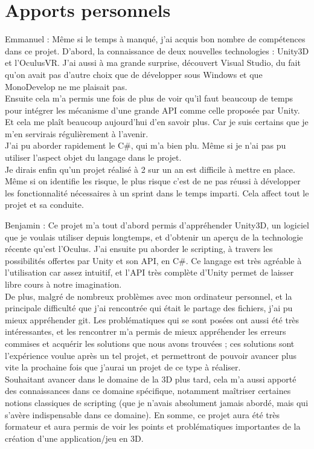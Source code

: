 \documentclass[a4paper,11pt]{myreport}
\begin{document}
\chapter{Apports personnels}
\par Emmanuel : Même si le temps à manqué, j'ai acquis bon nombre de compétences dans ce projet. D'abord, la connaissance de deux nouvelles technologies : Unity3D et l'OculusVR. J'ai aussi à ma grande surprise, découvert Visual Studio, du fait qu'on avait pas d'autre choix que de développer sous Windows et que MonoDevelop ne me plaisait pas.\\
Ensuite cela m'a permis une fois de plus de voir qu'il faut beaucoup de temps pour intégrer les mécanisme d'une grande API comme celle proposée par Unity. Et cela me plaît beaucoup aujourd'hui d'en savoir plus. Car je suis certains que je m'en servirais régulièrement à l'avenir.\\
J'ai pu aborder rapidement le C\#, qui m'a bien plu. Même si je n'ai pas pu utiliser l'aspect objet du langage dans le projet.\\
Je dirais enfin qu'un projet réalisé à 2 sur un an est difficile à mettre en place. Même si on identifie les risque, le plus risque c'est de ne pas réussi à développer les fonctionnalité nécessaires à un sprint dans le temps imparti. Cela affect tout le projet et sa conduite.
\par Benjamin : Ce projet m'a tout d'abord permis d'appréhender Unity3D, un logiciel que je voulais utiliser depuis longtemps, et d'obtenir un aperçu de la technologie récente qu'est l'Oculus. J'ai ensuite pu aborder le scripting, à travers les possibilités offertes par Unity et son API, en C\#. Ce langage est très agréable à l'utilisation car assez intuitif, et l'API très complète d'Unity permet de laisser libre cours à notre imagination.\\
De plus, malgré de nombreux problèmes avec mon ordinateur personnel, et la principale difficulté que j'ai rencontrée qui était le partage des fichiers, j'ai pu mieux appréhender git.
Les problématiques qui se sont posées ont aussi été très intéressantes, et les rencontrer m'a permis de mieux appréhender les erreurs commises et acquérir les solutions que nous avons trouvées ; ces solutions sont l'expérience voulue après un tel projet, et permettront de pouvoir avancer plus vite la prochaine fois que j'aurai un projet de ce type à réaliser. \\
Souhaitant avancer dans le domaine de la 3D plus tard, cela m'a aussi apporté des connaissances dans ce domaine spécifique, notamment maîtriser certaines notions classiques de scripting (que je n'avais absolument jamais abordé, mais qui s'avère indispensable dans ce domaine).
En somme, ce projet aura été très formateur et aura permis de voir les points et problématiques importantes de la création d'une application/jeu en 3D.

\listoffigures
\end{document}
